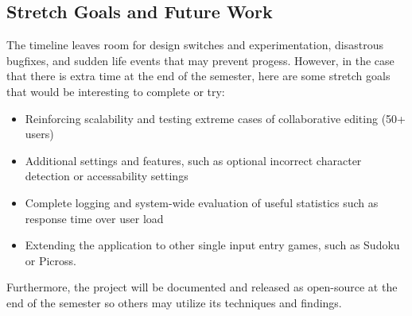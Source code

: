 \documentclass{article}
\begin{document}
\subsection{Stretch Goals and Future Work}
The timeline leaves room for design switches and experimentation, disastrous bugfixes, and sudden life events that
may prevent progess. However, in the case that there is extra time at the end of the semester, here are some stretch
goals that would be interesting to complete or try:
\begin{itemize}
    \item Reinforcing scalability and testing extreme cases of collaborative editing (50+ users)
    \item Additional settings and features, such as optional incorrect character detection or accessability settings
    \item Complete logging and system-wide evaluation of useful statistics such as response time over user load
    \item Extending the application to other single input entry games, such as Sudoku or Picross.
\end{itemize}

Furthermore, the project will be documented and released as open-source at the end of the semester so others may utilize its techniques and findings.

\newpage


\end{document}
